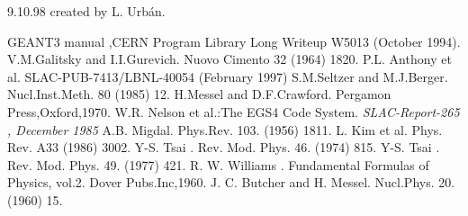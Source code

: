    9.10.98  created by L. Urb\'an.
  
\begin{thebibliography}{99}

  GEANT3 manual ,CERN Program Library Long Writeup W5013 (October 1994).
  V.M.Galitsky and I.I.Gurevich. Nuovo Cimento 32 (1964) 1820.
  P.L. Anthony et al. SLAC-PUB-7413/LBNL-40054 (February 1997)
  S.M.Seltzer and M.J.Berger. Nucl.Inst.Meth. 80 (1985) 12.
  H.Messel and D.F.Crawford. Pergamon Press,Oxford,1970.
 W.R. Nelson et al.:The EGS4 Code System.
   {\em SLAC-Report-265 , December 1985 }
   A.B. Migdal. Phys.Rev. 103. (1956) 1811.
   L. Kim et al. Phys. Rev. A33 (1986) 3002.
   Y-S. Tsai . Rev. Mod. Phys. 46. (1974) 815.
   Y-S. Tsai . Rev. Mod. Phys. 49. (1977) 421.
   R. W. Williams . Fundamental Formulas of Physics, vol.2. Dover Pubs.Inc,1960.
   J. C. Butcher and H. Messel. Nucl.Phys. 20. (1960) 15.

\end{thebibliography}

